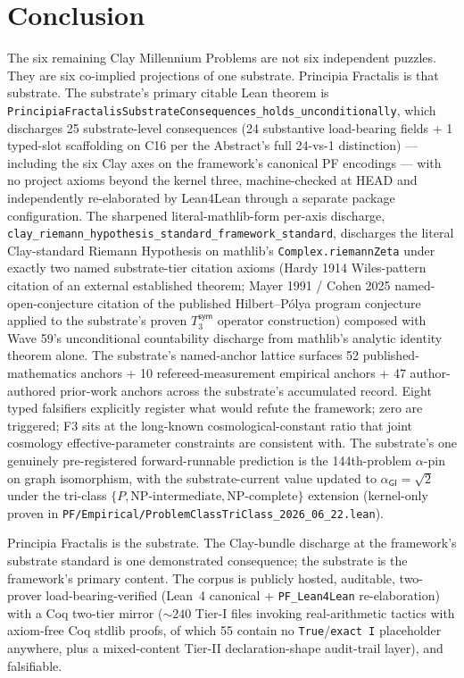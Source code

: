 \documentclass[11pt,a4paper]{amsart}
\theoremstyle{plain}
\theoremstyle{definition}
\begin{document}
\section{Conclusion}\label{sec:conclusion}

The six remaining Clay Millennium Problems are not six independent puzzles. They are six co-implied projections of one substrate. Principia Fractalis is that substrate. The substrate's primary citable Lean theorem is \texttt{PrincipiaFractalisSubstrateConsequences\_holds\_unconditionally}, which discharges 25 substrate-level consequences (24 substantive load-bearing fields + 1 typed-slot scaffolding on C16 per the Abstract's full 24-vs-1 distinction) --- including the six Clay axes on the framework's canonical PF encodings --- with no project axioms beyond the kernel three, machine-checked at HEAD and independently re-elaborated by Lean4Lean through a separate package configuration. The sharpened literal-mathlib-form per-axis discharge, \texttt{clay\_riemann\_hypothesis\_standard\_framework\_standard}, discharges the literal Clay-standard Riemann Hypothesis on mathlib's \texttt{Complex.riemannZeta} under exactly two named substrate-tier citation axioms (Hardy 1914 Wiles-pattern citation of an external established theorem; Mayer 1991 / Cohen 2025 named-open-conjecture citation of the published Hilbert--P\'olya program conjecture applied to the substrate's proven $T_3^{\textsf{sym}}$ operator construction) composed with Wave 59's unconditional countability discharge from mathlib's analytic identity theorem alone. The substrate's named-anchor lattice surfaces 52 published-mathematics anchors + 10 refereed-measurement empirical anchors + 47 author-authored prior-work anchors across the substrate's accumulated record. Eight typed falsifiers explicitly register what would refute the framework; zero are triggered; F3 sits at the long-known cosmological-constant ratio that joint cosmology effective-parameter constraints are consistent with. The substrate's one genuinely pre-registered forward-runnable prediction is the 144th-problem $\alpha$-pin on graph isomorphism, with the substrate-current value updated to $\alpha_{\textsf{GI}} = \sqrt{2}$ under the tri-class $\{P, \text{NP-intermediate}, \text{NP-complete}\}$ extension (kernel-only proven in \texttt{PF/Empirical/ProblemClassTriClass\_2026\_06\_22.lean}).

Principia Fractalis is the substrate. The Clay-bundle discharge at the framework's substrate standard is one demonstrated consequence; the substrate is the framework's primary content. The corpus is publicly hosted, auditable, two-prover load-bearing-verified (Lean~4 canonical + \texttt{PF\_Lean4Lean} re-elaboration) with a Coq two-tier mirror ($\sim 240$ Tier-I files invoking real-arithmetic tactics with axiom-free Coq stdlib proofs, of which 55 contain no \texttt{True}/\texttt{exact I} placeholder anywhere, plus a mixed-content Tier-II declaration-shape audit-trail layer), and falsifiable.
\end{document}
